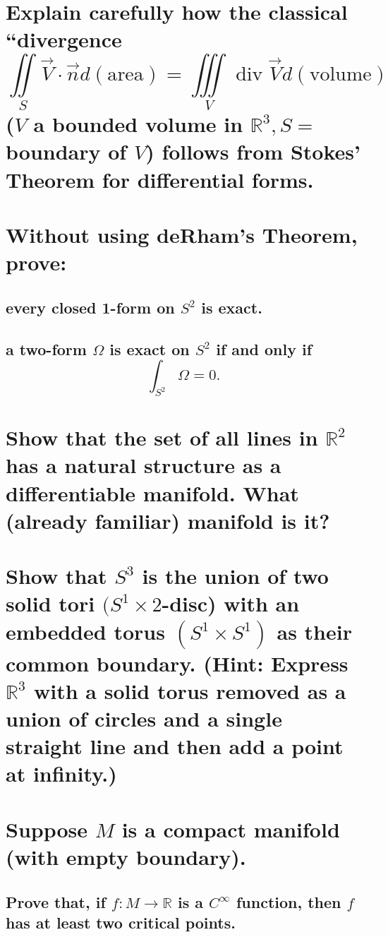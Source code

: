 \documentclass[10pt]{article}
\DeclareMathOperator{\dev}{div}
\newcommand{\hint}[1]{(Hint: #1)}
\begin{document}
 

\section{Explain carefully how the classical ``divergence 
$$\iint\limits_S \vec{V} \cdot \vec{n} d(\mathrm{area}) = \iiint\limits_V \dev \vec{V} d(\mathrm{volume})$$
($V$ a bounded volume in $\mathbb{R} ^3, S= $ boundary of $V$) follows from Stokes' Theorem for
differential forms.}

\section{Without using deRham's Theorem, prove:}

\subsection{every closed 1-form on $S^2$ is exact.}

\subsection{a two-form $\Omega$ is exact on $S^2$ if and only if 
$$\int_{S^2}\Omega=0.$$}

\section{Show that the set of all lines in $\mathbb{R} ^2$ has a natural structure as a
  differentiable manifold. What (already familiar) manifold is it?}

\section{Show that $S^3$ is the union of two solid tori $(S^1 \times 2$-disc) with an embedded torus
  $(S^1 \times S^1)$ as their common boundary. \hint{Express $\mathbb{R} ^3$ with a solid torus
    removed as a union of circles and a single straight line and then add a point at infinity.}}

\section{Suppose $M$ is a compact manifold (with empty boundary).}

\subsection{Prove that, if $f: M \to \mathbb{R}$ is a $C^\infty$ function, then $f$ has at least two
critical points.}
\end{document}
